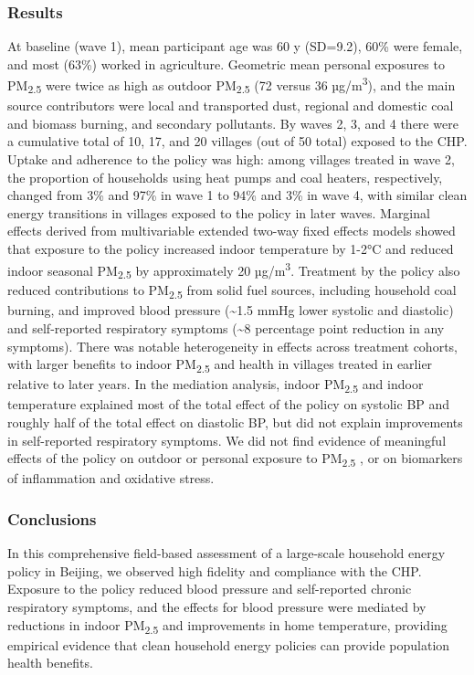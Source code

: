 \documentclass[
  letterpaper,
  DIV=11,
  numbers=noendperiod]{scrartcl}
\begin{document}
\subsubsection*{Results}\label{results}

At baseline (wave 1), mean participant age was 60 y (SD=9.2), 60\% were
female, and most (63\%) worked in agriculture. Geometric mean personal
exposures to PM\textsubscript{2.5} were twice as high as outdoor
PM\textsubscript{2.5} (72 versus 36 µg/m\textsuperscript{3}), and the
main source contributors were local and transported dust, regional and
domestic coal and biomass burning, and secondary pollutants. By waves 2,
3, and 4 there were a cumulative total of 10, 17, and 20 villages (out
of 50 total) exposed to the CHP. Uptake and adherence to the policy was
high: among villages treated in wave 2, the proportion of households
using heat pumps and coal heaters, respectively, changed from 3\% and
97\% in wave 1 to 94\% and 3\% in wave 4, with similar clean energy
transitions in villages exposed to the policy in later waves. Marginal
effects derived from multivariable extended two-way fixed effects models
showed that exposure to the policy increased indoor temperature by 1-2°C
and reduced indoor seasonal PM\textsubscript{2.5} by approximately 20
µg/m\textsuperscript{3}. Treatment by the policy also reduced
contributions to PM\textsubscript{2.5} from solid fuel sources,
including household coal burning, and improved blood pressure
(\textasciitilde1.5 mmHg lower systolic and diastolic) and self-reported
respiratory symptoms (\textasciitilde8 percentage point reduction in any
symptoms). There was notable heterogeneity in effects across treatment
cohorts, with larger benefits to indoor PM\textsubscript{2.5} and health
in villages treated in earlier relative to later years. In the mediation
analysis, indoor PM\textsubscript{2.5} and indoor temperature explained
most of the total effect of the policy on systolic BP and roughly half
of the total effect on diastolic BP, but did not explain improvements in
self-reported respiratory symptoms. We did not find evidence of
meaningful effects of the policy on outdoor or personal exposure to
PM\textsubscript{2.5} , or on biomarkers of inflammation and oxidative
stress.

\subsubsection*{Conclusions}\label{conclusions}

In this comprehensive field-based assessment of a large-scale household
energy policy in Beijing, we observed high fidelity and compliance with
the CHP. Exposure to the policy reduced blood pressure and self-reported
chronic respiratory symptoms, and the effects for blood pressure were
mediated by reductions in indoor PM\textsubscript{2.5} and improvements
in home temperature, providing empirical evidence that clean household
energy policies can provide population health benefits.
\end{document}
